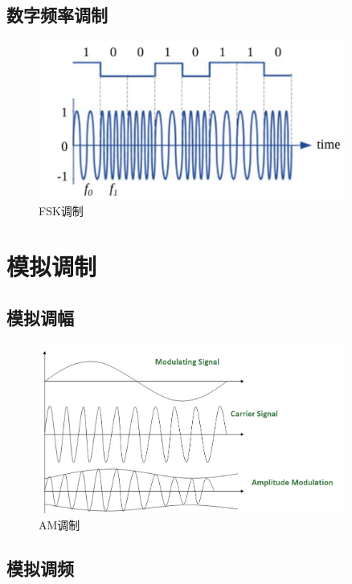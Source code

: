 \documentclass[lang=cn,newtx,10pt,scheme=chinese]{elegantbook}
\begin{document}
\subsection{数字频率调制}

\begin{figure}[!htb]
\centering
\includegraphics[width=0.9\textwidth]{fsk2.pdf}
\caption{FSK调制}
\label{fig:FSK}
\end{figure}

\section{模拟调制}

\subsection{模拟调幅}

\begin{figure}[!htb]
\centering
\includegraphics[width=0.9\textwidth]{Amplitue_Modulation.png}
\caption{AM调制}
\label{fig:AM-Modulation}
\end{figure}

\subsection{模拟调频}
\end{document}
